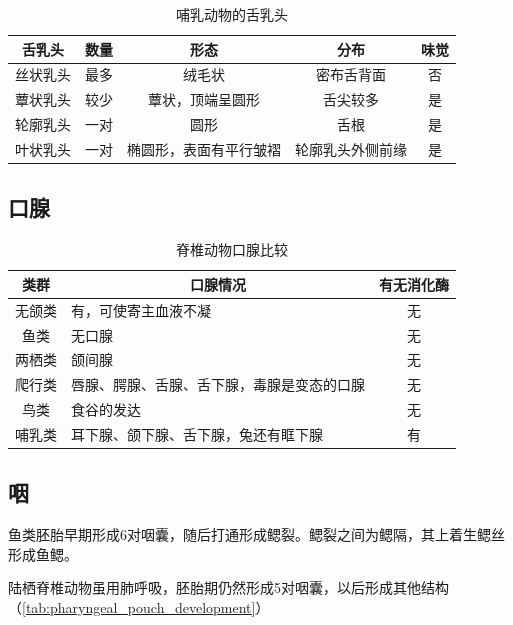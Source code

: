 \begin{table}[htbp]
	\centering
	\begin{tabularx}{\textwidth}{|c|c|C|C|c|}
		\hline
		\textbf{舌乳头} & \textbf{数量} & \textbf{形态} & \textbf{分布} & \textbf{味觉} \\ \hline
		丝状乳头 & 最多 & 绒毛状 & 密布舌背面 & 否 \\ \hline
		蕈状乳头 & 较少 & 蕈状，顶端呈圆形 & 舌尖较多 & 是 \\ \hline
		轮廓乳头 & 一对 & 圆形 & 舌根 & 是 \\ \hline
		叶状乳头 & 一对 & 椭圆形，表面有平行皱褶 & 轮廓乳头外侧前缘 & 是 \\ \hline
	\end{tabularx}
	\caption{哺乳动物的舌乳头}
	\label{tab:mammal_tongue}
\end{table}

\subsection{口腺}

\begin{table}[htbp]
	\centering
	\begin{tabularx}{\textwidth}{|c|X|c|}
		\hline
		\textbf{类群} & \multicolumn{1}{c|}{\textbf{口腺情况}} & \textbf{有无消化酶} \\ \hline
		无颌类 & 有，可使寄主血液不凝 & 无 \\ \hline
		鱼类 & 无口腺 & 无 \\ \hline
		两栖类 & 颌间腺 & 无 \\ \hline
		爬行类 & 唇腺、腭腺、舌腺、舌下腺，毒腺是变态的口腺 & 无 \\ \hline
		鸟类 & 食谷的发达 & 无\footnotemark \\ \hline
		哺乳类 & 耳下腺、颌下腺、舌下腺，兔还有眶下腺 & 有 \\ \hline
	\end{tabularx}
	\caption{脊椎动物口腺比较}
	\label{tab:oral_gland}
\end{table}

\subsection{咽}

鱼类胚胎早期形成6对咽囊，随后打通形成鳃裂。鳃裂之间为鳃隔，其上着生鳃丝形成鱼鳃。

陆栖脊椎动物虽用肺呼吸，胚胎期仍然形成5对咽囊，以后形成其他结构（\autoref{tab:pharyngeal_pouch_development}）

